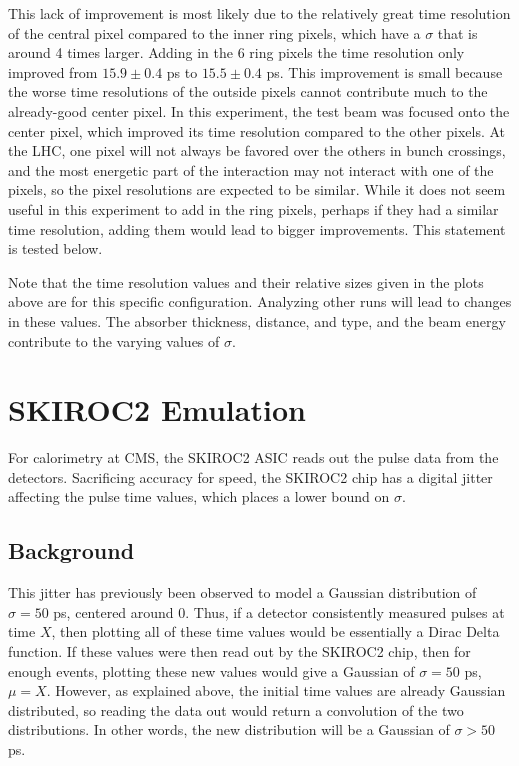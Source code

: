 \documentclass[12pt]{article}
\begin{document}
This lack of improvement is most likely due to the relatively great time resolution of the central pixel compared to the inner ring pixels, which have a $\sigma$ that is around 4 times larger. 
Adding in the 6 ring pixels the time resolution only improved from $15.9 \pm 0.4$ ps to $15.5 \pm 0.4$ ps.
This improvement is small because the worse time resolutions of the outside pixels cannot contribute much to the already-good center pixel.
In this experiment, the test beam was focused onto the center pixel, which improved its time resolution compared to the other pixels. 
At the LHC, one pixel will not always be favored over the others in bunch crossings, and the most energetic part of the interaction may not interact with one of the pixels, so the pixel resolutions are expected to be similar.
While it does not seem useful in this experiment to add in the ring pixels, perhaps if they had a similar time resolution, adding them would lead to bigger improvements.
This statement is tested below.

Note that the time resolution values and their relative sizes given in the plots above are for this specific configuration.
Analyzing other runs will lead to changes in these values. 
The absorber thickness, distance, and type, and the beam energy contribute to the varying values of $\sigma$.

\section{SKIROC2 Emulation}
For calorimetry at CMS, the SKIROC2 ASIC reads out the pulse data from the detectors.
Sacrificing accuracy for speed, the SKIROC2 chip has a digital jitter affecting the pulse time values, which places a lower bound on $\sigma$. 

\subsection{Background}
This jitter has previously been observed to model a Gaussian distribution of $\sigma=50$ ps, centered around 0.
Thus, if a detector consistently measured pulses at time $X$, then plotting all of these time values would be essentially a Dirac Delta function.
If these values were then read out by the SKIROC2 chip, then for enough events, plotting these new values would give a Gaussian of $\sigma = 50$ ps, $\mu = X$.
However, as explained above, the initial time values are already Gaussian distributed, so reading the data out would return a convolution of the two distributions. 
In other words, the new distribution will be a Gaussian of $\sigma > 50$ ps.
\end{document}
